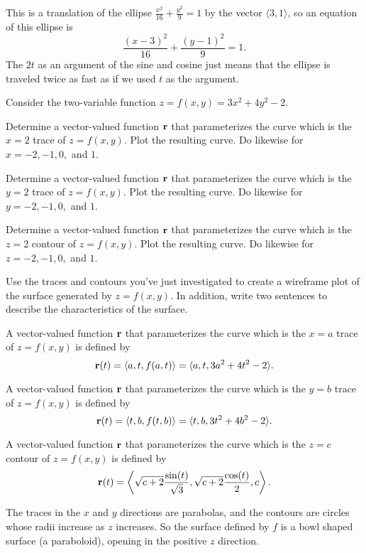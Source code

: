 \begin{exercises}
\begin{exerciseSolution}
	\item This is a translation of the ellipse $\frac{x^2}{16} + \frac{y^2}{9} = 1$ by the vector $\langle 3,1\rangle$, so an equation of this ellipse is 
\[\frac{(x-3)^2}{16} + \frac{(y-1)^2}{9} = 1.\]
The $2t$ as an argument of the sine and cosine just means that the ellipse is traveled twice as fast as if we used $t$ as the argument. 
\ea
\end{exerciseSolution}

\item \label{Ez:9.6.3}   Consider the two-variable function $z = f(x,y) = 3x^2 + 4y^2 - 2$. 


\ba
	\item Determine a vector-valued function $\mathbf{r}$ that parameterizes the curve which is the $x = 2$ trace of $z = f(x,y)$.  Plot the resulting curve.  Do likewise for $x = -2, -1, 0,$ and $1$.
	\item Determine a vector-valued function $\mathbf{r}$ that parameterizes the curve which is the $y = 2$ trace of $z = f(x,y)$.  Plot the resulting curve.  Do likewise for $y = -2, -1, 0,$ and $1$.
	\item Determine a vector-valued function $\mathbf{r}$ that parameterizes the curve which is the $z = 2$ contour of $z = f(x,y)$.  Plot the resulting curve.  Do likewise for $z = -2, -1, 0,$ and $1$.
	\item Use the traces and contours you've just investigated to create a wireframe plot of the surface generated by $z = f(x,y)$.  In addition, write two sentences to describe the characteristics of the surface.
\ea

\begin{exerciseSolution}
\ba
	\item A vector-valued function $\mathbf{r}$ that parameterizes the curve which is the $x = a$ trace of $z = f(x,y)$ is defined by 
\[\mathbf{r}(t) = \langle a, t, f(a,t) \rangle = \langle a, t, 3a^2+4t^2-2 \rangle.\]
	\item A vector-valued function $\mathbf{r}$ that parameterizes the curve which is the $y = b$ trace of $z = f(x,y)$ is defined by 
\[\mathbf{r}(t) = \langle t, b, f(t,b) \rangle = \langle t, b, 3t^2+4b^2-2 \rangle.\]
	\item A vector-valued function $\mathbf{r}$ that parameterizes the curve which is the $z = c$ contour of $z = f(x,y)$ is defined by 
\[\mathbf{r}(t) = \left\langle \sqrt{c+2}\frac{\sin(t)}{\sqrt{3}}, \sqrt{c+2}\frac{\cos(t)}{2}, c \right\rangle.\]
	\item The traces in the $x$ and $y$ directions are parabolas, and the contours are circles whose radii increase as $z$ increases. So the surface defined by $f$ is a bowl shaped surface (a paraboloid), opening in the positive $z$ direction. 
\ea
\end{exerciseSolution}


\end{exercises}
